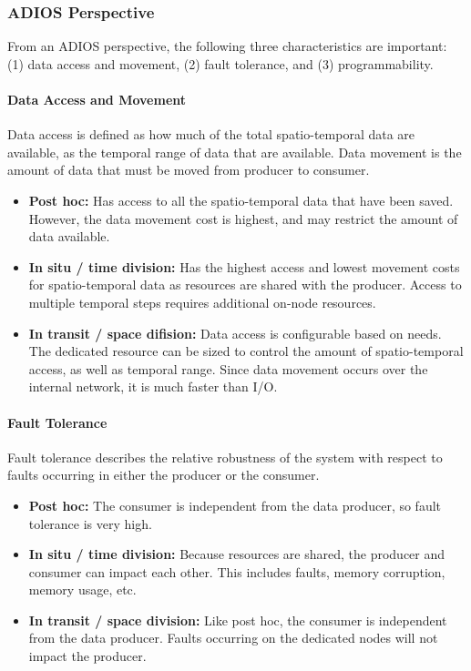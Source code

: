 \documentclass[x11names,table,xcdraw,graybox]{svmult}
\begin{document}
\subsubsection{ADIOS Perspective}
From an ADIOS perspective, the following three characteristics are important: (1) data access and movement, (2) fault tolerance, and (3) programmability.

\paragraph{\textbf{Data Access and Movement}}
Data access is defined as how much of the total spatio-temporal data are available, as the temporal range of data that are available. Data movement is the amount of data that must be moved from producer to consumer.
\begin{itemize}
    \item \textbf{Post hoc:} Has access to all the spatio-temporal data that have been saved. However, the data movement cost is highest, and may restrict the amount of data available.
    \item \textbf{In situ / time division:} Has the highest access and lowest movement costs for spatio-temporal data as resources are shared with the producer. Access to multiple temporal steps requires additional on-node resources.
    \item \textbf{In transit / space difision:} Data access is configurable based on needs. The dedicated resource can be sized to control the amount of spatio-temporal access, as well as temporal range. Since data movement occurs over the internal network, it is much faster than I/O.
\end{itemize}

\paragraph{\textbf{Fault Tolerance}}
Fault tolerance describes the relative robustness of the system with respect to faults occurring in either the producer or the consumer.
\begin{itemize}
    \item \textbf{Post hoc:} The consumer is independent from the data producer, so fault tolerance is very high.
    \item \textbf{In situ / time division:} Because resources are shared, the producer and consumer can impact each other. This includes faults, memory corruption, memory usage, etc.
    \item \textbf{In transit / space division:} Like post hoc, the consumer is independent from the data producer. Faults occurring on the dedicated nodes will not impact the producer.
\end{itemize}
\end{document}
